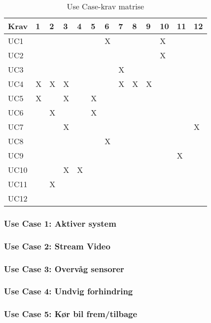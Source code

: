 \begin{table}[h]
\centering
\begin{tabularx}{\textwidth-5cm}{| L{1 cm} | X | X | X | X | X | X | X | X | X | X | X | X |}
\hline
Krav&1&2&3&4&5&6&7&8&9&10&11&12 \\ \hline
UC1 & & & & & &X& & & &X &  &   \\ \hline
UC2 & & & & & & & & & &X &  &   \\ \hline
UC3 & & & & & & &X& & &  &  &   \\ \hline
UC4 &X&X&X& & & &X&X&X&  &  &   \\ \hline
UC5 &X& &X& &X& & & & &  &  &   \\ \hline
UC6 & &X& & &X& & & & &  &  &   \\ \hline
UC7 & & &X& & & & & & &  &  &X  \\ \hline
UC8 & & & & & &X& & & &  &  &   \\ \hline
UC9 & & & & & & & & & &  &X &   \\ \hline
UC10& & &X&X& & & & & &  &  &   \\ \hline
UC11& &X& & & & & & & &  &  &   \\ \hline
UC12& & & & & & & & & &  &  &   \\ \hline
\end{tabularx}
\caption{Use Case-krav matrise}
\label{tbl:kravucmatrise}
\end{table}

\subsubsection{Use Case 1: Aktiver system}
\subsubsection{Use Case 2: Stream Video}
\clearpage
\subsubsection{Use Case 3: Overvåg sensorer}
\clearpage
\subsubsection{Use Case 4: Undvig forhindring}
\clearpage
\subsubsection{Use Case 5: Kør bil frem/tilbage}
\clearpage
